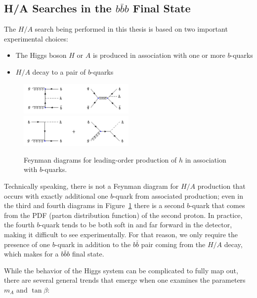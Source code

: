 \subsection{H/A Searches in the $b\bar{b}b$ Final State}
The $H/A$ search being performed in this thesis is based on two important experimental choices:

\begin{itemize}
    \item The Higgs boson $H$ or $A$ is produced in association with one or more $b$-quarks
    \item $H/A$ decay to a pair of $b$-quarks
\end{itemize}

\begin{figure}[H]
	\includegraphics[width=0.5\textwidth]{Theory/FeynmanDiagrams/bbH_FeynmanDiagrams.pdf}		
	\includegraphics[width=0.5\textwidth]{Theory/FeynmanDiagrams/bH_FeynmanDiagrams.pdf}
	\caption{Feynman diagrams for leading-order production of $h$ in association with $b$-quarks.  \label{fig:fd}}
\end{figure}

Technically speaking, there is not a Feynman diagram for $H/A$ 
production that occurs with exactly additional one $b$-quark from associated production; even in 
the third and fourth diagrams in Figure~\ref{fig:fd} there 
is a second $b$-quark that comes from the PDF (parton distribution 
function) of the second proton.  In practice, the fourth $b$-quark 
tends to be both soft in \pt and far forward in the detector, 
making it difficult to see experimentally.  For that reason, we only require the 
presence of one $b$-quark in addition to the $b\bar{b}$ pair 
coming from the $H/A$ decay, which makes for a $b\bar{b}b$ final state.



While the behavior of the Higgs system can be complicated to fully map out, 
there are several general trends that emerge when one examines the parameters $m_A$ and $\tan\beta$:

